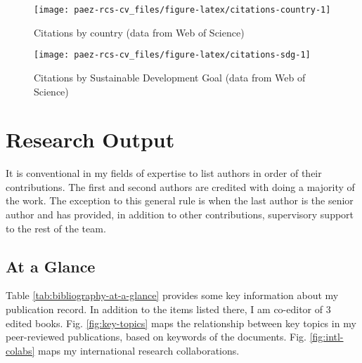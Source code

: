 \documentclass[11pt,a4paper,]{awesome-cv}
\begin{document}
\begin{figure}

{\centering \texttt{[image: paez-rcs-cv\_files/figure-latex/citations-country-1]} 

}

\caption{\label{fig:citations-by-sdg}Citations by country (data from Web of Science)}\label{fig:citations-country}
\end{figure}

\begin{figure}

{\centering \texttt{[image: paez-rcs-cv\_files/figure-latex/citations-sdg-1]} 

}

\caption{\label{fig:citations-by-country}Citations by Sustainable Development Goal (data from Web of Science)}\label{fig:citations-sdg}
\end{figure}

\section{Research Output}\label{research-output}

It is conventional in my fields of expertise to list authors in order of
their contributions. The first and second authors are credited with
doing a majority of the work. The exception to this general rule is when
the last author is the senior author and has provided, in addition to
other contributions, supervisory support to the rest of the team.

\subsection{At a Glance}\label{at-a-glance}

Table \ref{tab:bibliography-at-a-glance} provides some key information
about my publication record. In addition to the items listed there, I am
co-editor of 3 edited books. Fig. \ref{fig:key-topics} maps the
relationship between key topics in my peer-reviewed publications, based
on keywords of the documents. Fig. \ref{fig:intl-colabs} maps my
international research collaborations.
\end{document}
